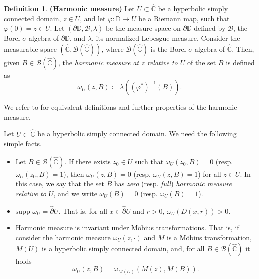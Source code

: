 \documentclass[11pt]{article}
\theoremstyle{definition}
\newtheorem{defi}[thm]{Definition}
\theoremstyle{remark}
\newcounter{main}
\theoremstyle{plain}
\begin{document}
\begin{defi}{\bf (Harmonic measure)}
	Let $ U\subset\widehat{\mathbb{C}} $ be a hyperbolic simply connected domain, $ z\in U $, and let $ \varphi\colon\mathbb{D}\to U $ be a Riemann map, such that $ \varphi(0)=z\in U $. Let $ (\partial\mathbb{D}, \mathcal{B}, \lambda) $ be the measure space on $ \partial \mathbb{D} $ defined by $ \mathcal{B} $, the Borel $ \sigma $-algebra of $ \partial \mathbb{D} $, and $ \lambda $, its normalized Lebesgue measure. Consider the measurable space $ (\widehat{\mathbb{C}}, \mathcal{B}(\widehat{\mathbb{C}})) $, where  $ \mathcal{B}(\widehat{\mathbb{C}}) $ is the Borel $ \sigma $-algebra of $ \widehat{\mathbb{C}} $. Then, given $ B\in  \mathcal{B}(\widehat{\mathbb{C}}) $, the \textit{harmonic measure at $ z $ relative to $ U $} of the set $ B$ is defined as\[\omega_U(z, B)\coloneqq\lambda ((\varphi^*)^{-1}(B)).\]
\end{defi}

We refer to \cite{harmonicmeasure2, Pommerenke} for equivalent definitions and further properties of the harmonic measure. 


Let $ U\subset\widehat{\mathbb{C}} $ be a hyperbolic simply connected domain. We need the following simple facts.
\begin{itemize}
	\item 	Let $ B\in\mathcal{B}(\widehat{\mathbb{C}}) $.  If there exists $ z_0\in U $ such that $ \omega_U(z_0, B)=0 $ (resp. $ \omega_U(z_0, B)=1 $), then $ \omega_U(z, B)=0 $ (resp. $ \omega_U(z, B)=1 $) for all $ z\in U $.
	In this case, we say that the set $ B $ has {\em zero} (resp. {\em full}) {\em harmonic measure relative to $ U $}, and we write $ \omega_U(B)=0 $ (resp. $ \omega_U(B)=1 $).
	
	\item 	$\textrm{supp }\omega_U =\widehat{\partial }U$.
	That is, for all $ x\in\widehat{\partial} U $ and $ r>0 $, $ \omega_U(D(x,r))>0 $. 
	
	\item Harmonic measure is invariant under Möbius transformations. That is, if  consider the harmonic measure $ \omega_U(z, \cdot) $ and
	$ M $ is a Möbius transformation, $ M(U) $ is a hyperbolic simply connected domain, and, for all $ B\in\mathcal {B}(\widehat{\mathbb{C}})$ it holds
	\[\omega_U(z, B)=\omega_{M(U)}(M(z), M(B)).\]
\end{itemize}
\end{document}
